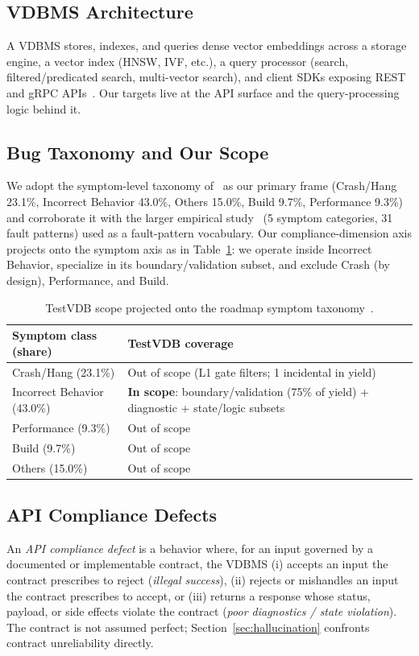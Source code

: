 \documentclass[sigconf]{acmart}
\begin{document}
\subsection{VDBMS Architecture}
A VDBMS stores, indexes, and queries dense vector embeddings across a storage engine, a vector index (HNSW, IVF, etc.), a query processor (search, filtered/predicated search, multi-vector search), and client SDKs exposing REST and gRPC APIs~\cite{roadmap25}. Our targets live at the API surface and the query-processing logic behind it.

\subsection{Bug Taxonomy and Our Scope}
We adopt the symptom-level taxonomy of~\cite{roadmap25} as our primary frame (Crash/Hang 23.1\%, Incorrect Behavior 43.0\%, Others 15.0\%, Build 9.7\%, Performance 9.3\%) and corroborate it with the larger empirical study~\cite{bugstudy25} (5 symptom categories, 31 fault patterns) used as a fault-pattern vocabulary. Our compliance-dimension axis projects onto the symptom axis as in Table~\ref{tab:scope}: we operate inside Incorrect Behavior, specialize in its boundary/validation subset, and exclude Crash (by design), Performance, and Build.

\begin{table}[t]
\caption{TestVDB scope projected onto the roadmap symptom taxonomy~\cite{roadmap25}.}
\label{tab:scope}
\small
\begin{tabular}{@{}p{}p{}@{}}
\toprule
Symptom class (share) & TestVDB coverage \\
\midrule
Crash/Hang (23.1\%) & Out of scope (L1 gate filters; 1 incidental in yield) \\
Incorrect Behavior (43.0\%) & \textbf{In scope}: boundary/validation (75\% of yield) + diagnostic + state/logic subsets \\
Performance (9.3\%) & Out of scope \\
Build (9.7\%) & Out of scope \\
Others (15.0\%) & Out of scope \\
\bottomrule
\end{tabular}
\end{table}

\subsection{API Compliance Defects}
An \emph{API compliance defect} is a behavior where, for an input governed by a documented or implementable contract, the VDBMS (i) accepts an input the contract prescribes to reject (\emph{illegal success}), (ii) rejects or mishandles an input the contract prescribes to accept, or (iii) returns a response whose status, payload, or side effects violate the contract (\emph{poor diagnostics / state violation}). The contract is not assumed perfect; Section~\ref{sec:hallucination} confronts contract unreliability directly.
\end{document}
